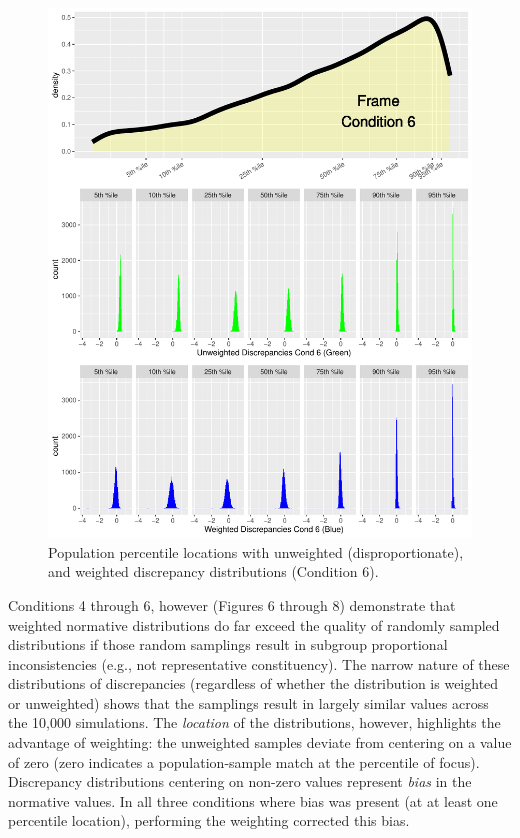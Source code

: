 \documentclass[
  ,man]{apa6}
\begin{document}
\begin{figure}
\centering
\includegraphics{NormsBuilding_files/figure-latex/Figure8-1.pdf}
\caption{\label{fig:Figure8}Population percentile locations with unweighted (disproportionate), and weighted discrepancy distributions (Condition 6).}
\end{figure}

Conditions 4 through 6, however (Figures 6 through 8) demonstrate that weighted normative distributions do far exceed the quality of randomly sampled distributions if those random samplings result in subgroup proportional inconsistencies (e.g., not representative constituency). The narrow nature of these distributions of discrepancies (regardless of whether the distribution is weighted or unweighted) shows that the samplings result in largely similar values across the 10,000 simulations. The \emph{location} of the distributions, however, highlights the advantage of weighting: the unweighted samples deviate from centering on a value of zero (zero indicates a population-sample match at the percentile of focus). Discrepancy distributions centering on non-zero values represent \emph{bias} in the normative values. In all three conditions where bias was present (at at least one percentile location), performing the weighting corrected this bias.
\end{document}
